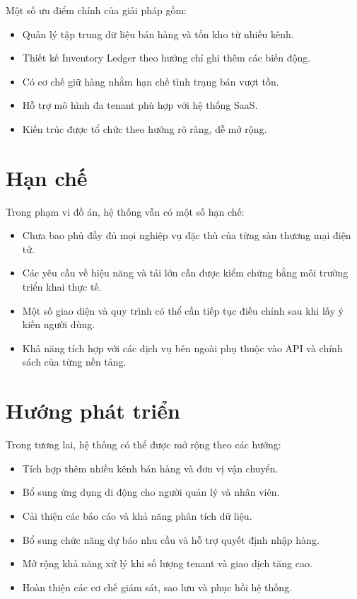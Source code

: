 Một số ưu điểm chính của giải pháp gồm:

\begin{itemize}
    \item Quản lý tập trung dữ liệu bán hàng và tồn kho từ nhiều kênh.
    \item Thiết kế Inventory Ledger theo hướng chỉ ghi thêm các biến động.
    \item Có cơ chế giữ hàng nhằm hạn chế tình trạng bán vượt tồn.
    \item Hỗ trợ mô hình đa tenant phù hợp với hệ thống SaaS.
    \item Kiến trúc được tổ chức theo hướng rõ ràng, dễ mở rộng.
\end{itemize}

\section{Hạn chế}

Trong phạm vi đồ án, hệ thống vẫn có một số hạn chế:

\begin{itemize}
    \item Chưa bao phủ đầy đủ mọi nghiệp vụ đặc thù của từng sàn thương mại điện tử.
    \item Các yêu cầu về hiệu năng và tải lớn cần được kiểm chứng bằng môi trường triển khai thực tế.
    \item Một số giao diện và quy trình có thể cần tiếp tục điều chỉnh sau khi lấy ý kiến người dùng.
    \item Khả năng tích hợp với các dịch vụ bên ngoài phụ thuộc vào API và chính sách của từng nền tảng.
\end{itemize}

\section{Hướng phát triển}

Trong tương lai, hệ thống có thể được mở rộng theo các hướng:

\begin{itemize}
    \item Tích hợp thêm nhiều kênh bán hàng và đơn vị vận chuyển.
    \item Bổ sung ứng dụng di động cho người quản lý và nhân viên.
    \item Cải thiện các báo cáo và khả năng phân tích dữ liệu.
    \item Bổ sung chức năng dự báo nhu cầu và hỗ trợ quyết định nhập hàng.
    \item Mở rộng khả năng xử lý khi số lượng tenant và giao dịch tăng cao.
    \item Hoàn thiện các cơ chế giám sát, sao lưu và phục hồi hệ thống.
\end{itemize}

